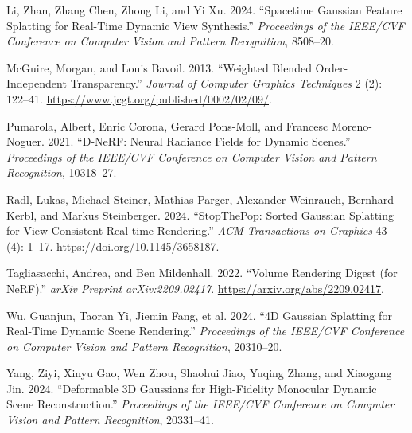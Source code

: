 \documentclass[
]{article}
\newlength{\cslhangindent}
\newenvironment{CSLReferences}[2] %
 {\begin{list}{}{%
  \setlength{\itemindent}{0pt}
  \setlength{\leftmargin}{0pt}
  \setlength{\parsep}{0pt}
  \ifodd #1
   \setlength{\leftmargin}{\cslhangindent}
   \setlength{\itemindent}{-1\cslhangindent}
  \fi
  \setlength{\itemsep}{#2\baselineskip}}}
 {\end{list}}
\begin{document}
\begin{CSLReferences}{1}{1}
Li, Zhan, Zhang Chen, Zhong Li, and Yi Xu. 2024. {``{Spacetime Gaussian
Feature Splatting for Real-Time Dynamic View Synthesis}.''}
\emph{Proceedings of the IEEE/CVF Conference on Computer Vision and
Pattern Recognition}, 8508--20.

McGuire, Morgan, and Louis Bavoil. 2013. {``{Weighted Blended
Order-Independent Transparency}.''} \emph{Journal of Computer Graphics
Techniques} 2 (2): 122--41.
\url{https://www.jcgt.org/published/0002/02/09/}.

Pumarola, Albert, Enric Corona, Gerard Pons-Moll, and Francesc
Moreno-Noguer. 2021. {``{D-NeRF: Neural Radiance Fields for Dynamic
Scenes}.''} \emph{Proceedings of the IEEE/CVF Conference on Computer
Vision and Pattern Recognition}, 10318--27.

Radl, Lukas, Michael Steiner, Mathias Parger, Alexander Weinrauch,
Bernhard Kerbl, and Markus Steinberger. 2024. {``{StopThePop: Sorted
Gaussian Splatting for View-Consistent Real-time Rendering}.''}
\emph{ACM Transactions on Graphics} 43 (4): 1--17.
\url{https://doi.org/10.1145/3658187}.

Tagliasacchi, Andrea, and Ben Mildenhall. 2022. {``{Volume Rendering
Digest (for NeRF)}.''} \emph{arXiv Preprint arXiv:2209.02417}.
\url{https://arxiv.org/abs/2209.02417}.

Wu, Guanjun, Taoran Yi, Jiemin Fang, et al. 2024. {``{4D Gaussian
Splatting for Real-Time Dynamic Scene Rendering}.''} \emph{Proceedings
of the IEEE/CVF Conference on Computer Vision and Pattern Recognition},
20310--20.

Yang, Ziyi, Xinyu Gao, Wen Zhou, Shaohui Jiao, Yuqing Zhang, and
Xiaogang Jin. 2024. {``{Deformable 3D Gaussians for High-Fidelity
Monocular Dynamic Scene Reconstruction}.''} \emph{Proceedings of the
IEEE/CVF Conference on Computer Vision and Pattern Recognition},
20331--41.

\end{CSLReferences}
\end{document}
